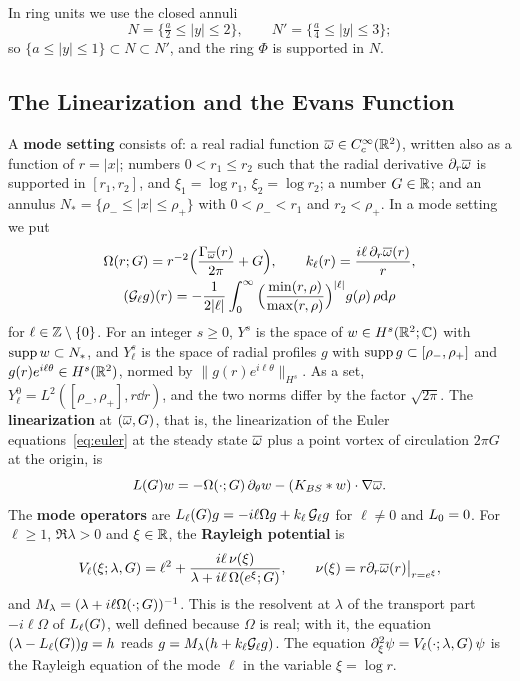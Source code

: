 In ring units we use the closed annuli
\[
N=\{\tfrac a2\le|y|\le2\},\qquad N'=\{\tfrac a4\le|y|\le3\};
\]
so $\{a\le|y|\le1\}\subset N\subset N'$, and the ring $\Phi$ is supported in $N$.

\subsection{The Linearization and the Evans Function}

\begin{definition}
\label{def:sector-setting}
A \textbf{mode setting} consists of: a real radial function
$\overline{\omega}\in C_c^\infty(\mathbb{R}^2)$, written also as a function of $r=|x|$; numbers
$0<r_1\le r_2$ such that the radial derivative $\partial_r\overline{\omega}$ is
supported in $[r_1,r_2]$, and $\xi_1=\log r_1$,
$\xi_2=\log r_2$; a number $G\in\mathbb{R}$; and an annulus
$N_*=\{\rho_-\le|x|\le\rho_+\}$ with $0<\rho_-<r_1$ and $r_2<\rho_+$. In a mode
setting we put
\[
\begin{gathered}
\Omega(r;G)=r^{-2}\Big(\frac{\Gamma_{\overline{\omega}}(r)}{2\pi}+G\Big),\qquad
k_\ell(r)=\frac{i\ell\,\partial_r\overline{\omega}(r)}{r},\\
(\mathcal{G}_\ell g)(r)=-\frac1{2|\ell|}\int_0^\infty\Big(\frac{\min(r,\rho)}{\max(r,\rho)}\Big)^{|\ell|}g(\rho)\,\rho\dd\rho
\end{gathered}
\]
for $\ell\in\mathbb{Z}\setminus\{0\}$. For an integer $s\ge0$, $Y^s$ is the space of
$w\in H^s(\mathbb{R}^2;\mathbb{C})$ with $\operatorname{supp} w\subset N_*$, and $Y^s_\ell$ is the space of
radial profiles $g$ with $\operatorname{supp} g\subset[\rho_-,\rho_+]$ and
$g(r)e^{i\ell\theta}\in H^s(\mathbb{R}^2)$, normed by $\|g(r)e^{i\ell\theta}\|_{H^s}$.
As a set, $Y^0_\ell=L^2([\rho_-,\rho_+],r\dd r)$, and the two norms differ by
the factor $\sqrt{2\pi}$. The \textbf{linearization} at $(\overline{\omega},G)$, that is,
the linearization of the Euler equations~\eqref{eq:euler} at the steady state
$\overline{\omega}$ plus a point vortex of circulation $2\pi G$ at the origin, is
\[
L(G)w=-\Omega(\cdot;G)\,\partial_\theta w-(K_{BS}\ast w)\cdot\nabla\overline{\omega} .
\]
The \textbf{mode operators} are $L_{\ell}(G)g=-i\ell\Omega g+k_\ell\,\mathcal{G}_\ell g$
for $\ell\ne0$ and $L_{0}=0$. For $\ell\ge1$, $\Re\lambda>0$ and $\xi\in\mathbb{R}$,
the \textbf{Rayleigh potential} is
\[
V_\ell(\xi;\lambda,G)=\ell^2+\frac{i\ell\,\nu(\xi)}{\lambda+i\ell\,\Omega(e^\xi;G)},\qquad
\nu(\xi)=r\partial_r\overline{\omega}(r)\big|_{r=e^\xi},
\]
and $M_\lambda=(\lambda+i\ell\Omega(\cdot;G))^{-1}$. This is the resolvent at
$\lambda$ of the transport part $-i\ell\Omega$ of $L_{\ell}(G)$, well defined
because $\Omega$ is real; with it, the equation $(\lambda-L_{\ell}(G))g=h$
reads $g=M_\lambda(h+k_\ell\mathcal{G}_\ell g)$. The equation
$\partial_\xi^2\psi=V_\ell(\cdot;\lambda,G)\,\psi$ is the Rayleigh equation of the mode
$\ell$ in the variable $\xi=\log r$.
\end{definition}

